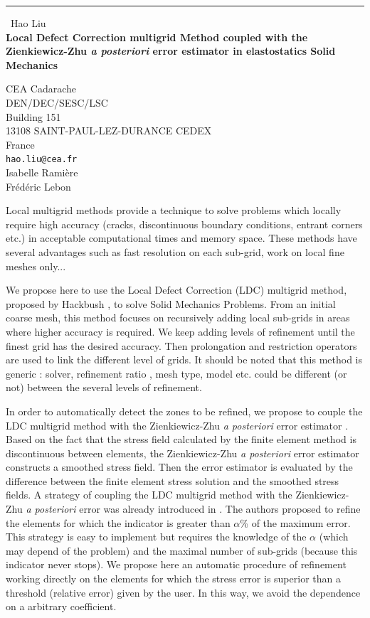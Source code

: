 \documentclass{report}
\begin{document}
\begin{center}
\rule{6in}{1pt} \
{\large Hao Liu \\
{\bf Local Defect Correction multigrid Method coupled with the Zienkiewicz-Zhu \emph{a posteriori} error estimator in elastostatics Solid Mechanics}}

CEA Cadarache \\ DEN/DEC/SESC/LSC \\ Building 151 \\ 13108 SAINT-PAUL-LEZ-DURANCE CEDEX \\ France
\\
{\tt hao.liu@cea.fr}\\
Isabelle Rami{\`e}re\\
Fr{\'e}d{\'e}ric Lebon\end{center}

Local multigrid methods provide a technique to solve problems which
locally require high accuracy (cracks, discontinuous boundary conditions,
entrant corners etc.) in acceptable computational times and memory space.
These methods have several advantages such as fast resolution on each
sub-grid, work on local fine meshes only...

We propose here to use the Local Defect Correction (LDC) multigrid
method, proposed by Hackbush \cite{Hackbusch84}, to solve Solid Mechanics
Problems. From an initial coarse mesh, this method focuses on recursively
adding local sub-grids in areas where higher accuracy is required. We
keep adding levels of refinement until the finest grid has the desired
accuracy. Then prolongation and restriction operators are used to link
the different level of grids. It should be noted that this method is
generic : solver, refinement ratio , mesh type, model etc. could be
different (or not) between the several levels of refinement.

In order to automatically detect the zones to be refined, we propose to
couple the LDC multigrid method with the Zienkiewicz-Zhu \emph{a
posteriori} error estimator \cite{Zienkiewicz87}. Based on the fact that
the stress field calculated by the finite element method is discontinuous
between elements, the Zienkiewicz-Zhu \emph{a posteriori} error estimator
constructs a smoothed stress field. Then the error estimator is evaluated
by the difference between the finite element stress solution and the
smoothed stress fields. A strategy of coupling the LDC multigrid method
with the Zienkiewicz-Zhu \emph{a posteriori} error was already introduced
in \cite{Barbie13CAS,Barbie11}. The authors proposed to refine the
elements for which the indicator is greater than $\alpha$\% of the
maximum error. This strategy is easy to implement but requires the
knowledge of the $\alpha$ (which may depend of the problem) and the
maximal number of sub-grids (because this indicator never stops). We
propose here an automatic procedure of refinement working directly on the
elements for which the stress error is superior than a threshold
(relative error) given by the user. In this way, we avoid the dependence
on a arbitrary coefficient.
\end{document}
